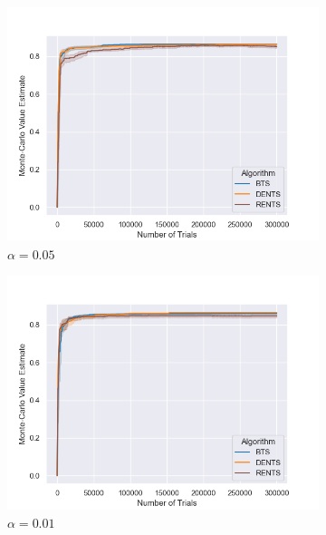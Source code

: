 \begin{figure}
                \begin{subfigure}[b]{0.32\textwidth}
                    \centering
                    \includegraphics[width=\textwidth]{figures/temp/fl_sens/056_fl8_0_05_02.png}
                    \caption{$\alpha=0.05$}
                \end{subfigure}
                \begin{subfigure}[b]{0.32\textwidth}
                    \centering
                    \includegraphics[width=\textwidth]{figures/temp/fl_sens/057_fl8_0_01_02.png}
                    \caption{$\alpha=0.01$}
                \end{subfigure}
                \begin{subfigure}[b]{0.32\textwidth}

\end{subfigure}
\end{figure}
